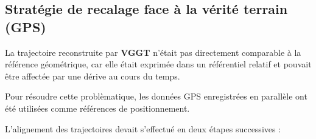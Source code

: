 \documentclass[12pt,a4paper,oneside]{report}
\begin{document}
\newpage

\subsection{Stratégie de recalage face à la vérité terrain (GPS)}

\vspace{0.5cm}

\hspace*{1cm}La trajectoire reconstruite par \textbf{VGGT} n'était pas directement comparable à la référence géométrique, car elle était exprimée dans un référentiel relatif et pouvait être affectée par une dérive au cours du temps.\vspace{0.2cm}

\hspace*{1cm}Pour résoudre cette problèmatique, les données GPS enregistrées en parallèle ont été utilisées comme références de positionnement. \vspace{0.05cm}

\hspace*{0.5cm}L'alignement des trajectoires devait s'effectué en deux étapes successives :\vspace{0.05cm}
\end{document}
